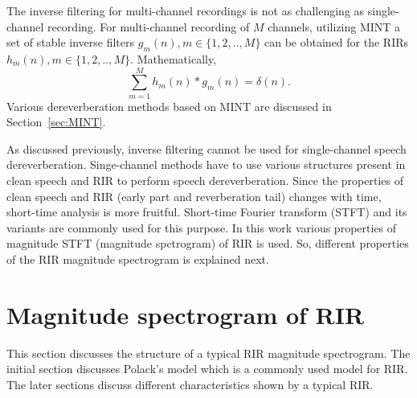 The inverse filtering for multi-channel recordings is not as challenging as single-channel recording. For multi-channel recording of $M$ channels, utilizing MINT a set of stable inverse filters $g_m(n),m \in \{1,2,..,M\}$ can be obtained for the RIRs $h_m(n),m \in \{1,2,..,M\}$. Mathematically,
\begin{equation}
\sum_{m=1}^M h_m(n)*g_m(n) = \delta(n)\text{.}
\end{equation}
Various dereverberation methods based on MINT are discussed in Section~\ref{sec:MINT}.

As discussed previously, inverse filtering cannot be used for single-channel speech dereverberation. Singe-channel methods have to use various structures present in clean speech and RIR to perform speech dereverberation. Since the properties of clean speech and RIR (early part and reverberation tail) changes with time, short-time analysis is more fruitful. Short-time Fourier transform (STFT) and its variants are commonly used for this purpose. In this work various properties of magnitude STFT (magnitude spctrogram) of RIR is used. So, different properties of the RIR magnitude spectrogram is explained next.

\section{Magnitude spectrogram of RIR}
This section discusses the structure of a typical RIR magnitude spectrogram. The initial section discusses Polack's model which is a commonly used model for RIR. The later sections discuss different characteristics shown by a typical RIR.

